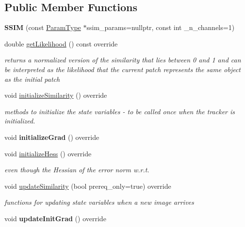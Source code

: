 \subsection*{Public Member Functions}
\begin{DoxyCompactItemize}
\item 
\hypertarget{classSSIM_ae818dfedca24b8b3765c0b162f6dad21}{{\bfseries S\-S\-I\-M} (const \hyperlink{structSSIMParams}{Param\-Type} $\ast$ssim\-\_\-params=nullptr, const int \-\_\-n\-\_\-channels=1)}\label{classSSIM_ae818dfedca24b8b3765c0b162f6dad21}

\item 
\hypertarget{classSSIM_aaceebed5228f6b65557f145539c3b41d}{double \hyperlink{classSSIM_aaceebed5228f6b65557f145539c3b41d}{get\-Likelihood} () const override}\label{classSSIM_aaceebed5228f6b65557f145539c3b41d}

\begin{DoxyCompactList}\small\item\em returns a normalized version of the similarity that lies between 0 and 1 and can be interpreted as the likelihood that the current patch represents the same object as the initial patch \end{DoxyCompactList}\item 
void \hyperlink{classSSIM_aa06b299557f6a42771f4b7988d63484b}{initialize\-Similarity} () override
\begin{DoxyCompactList}\small\item\em methods to initialize the state variables -\/ to be called once when the tracker is initialized. \end{DoxyCompactList}\item 
\hypertarget{classSSIM_ae1f423565bc3eb691f8237afffb8629e}{void {\bfseries initialize\-Grad} () override}\label{classSSIM_ae1f423565bc3eb691f8237afffb8629e}

\item 
void \hyperlink{classSSIM_ae6dca051fab96618be8971146726c6d9}{initialize\-Hess} () override
\begin{DoxyCompactList}\small\item\em even though the Hessian of the error norm w.\-r.\-t. \end{DoxyCompactList}\item 
void \hyperlink{classSSIM_a4f621ff32d95ef9d1f62cccf4cffe881}{update\-Similarity} (bool prereq\-\_\-only=true) override
\begin{DoxyCompactList}\small\item\em functions for updating state variables when a new image arrives \end{DoxyCompactList}\item 
\hypertarget{classSSIM_a6f3a156f7334bb35bb7b0b978b90474a}{void {\bfseries update\-Init\-Grad} () override}\label{classSSIM_a6f3a156f7334bb35bb7b0b978b90474a}


\end{DoxyCompactItemize}
